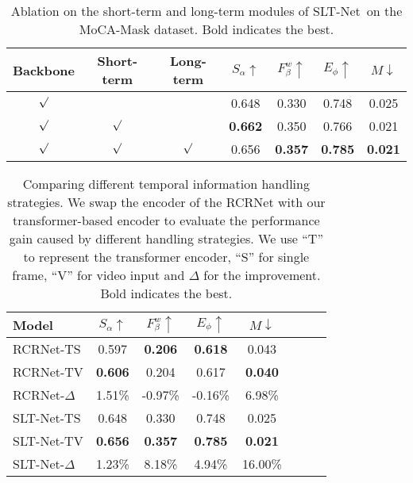\documentclass[10pt,twocolumn,letterpaper]{article}
\def\Ourmodel{SLT-Net}
\begin{document}
\begin{table}[t!]
    \footnotesize
    \centering
    \caption{Ablation on the short-term and long-term modules of \Ourmodel~on the MoCA-Mask dataset. Bold indicates the best.}
    \label{tab:ab_short_long}
    \vspace{-5pt}
    \tabcolsep=0.14cm
    \renewcommand{\arraystretch}{0.5}
    \begin{tabular}{ccc|cccc}
    \toprule
     Backbone & Short-term & Long-term & $S_\alpha\uparrow$ &$F_\beta^w\uparrow$  &$E_\phi\uparrow$ &$M\downarrow$ \\ 
     \midrule 
     $\surd$ & & & {0.648} &  {0.330}  & {0.748}  &  {0.025}  \\
     $\surd$ & $\surd$ & &  \textbf{0.662} & 0.350  & 0.766  & 0.021  \\
     $\surd$ & $\surd$ & $\surd$ & 0.656 & \textbf{0.357} & \textbf{0.785} & \textbf{0.021} \\
     
    \bottomrule
    \end{tabular}
\end{table}

\begin{table}[t!]
    \footnotesize
    \centering
    \caption{Comparing different temporal information handling strategies. We swap the encoder of the RCRNet \cite{yan2019semi} with our transformer-based encoder to evaluate the performance gain caused by different handling strategies. We use ``T'' to represent the transformer encoder, ``S'' for single frame, ``V'' for video input and $\Delta$ for the improvement. Bold indicates the best.}\label{tab:RCRnet}
    \vspace{-5pt}
    \tabcolsep=0.34cm
    \renewcommand{\arraystretch}{0.5}
    \begin{tabular}{l|ccccccc}
    \toprule
Model & $S_\alpha\uparrow$ &$F_\beta^w\uparrow$  &$E_\phi\uparrow$ &$M\downarrow$ \\ 
     \midrule 
     RCRNet-TS & 0.597 & \textbf{0.206} & \textbf{0.618} & 0.043 \\
     RCRNet-TV & \textbf{0.606} & 0.204 & 0.617 & \textbf{0.040} \\
     \hline
      RCRNet-$\Delta$  & 1.51\% &-0.97\% &-0.16\% &6.98\% \\
     \midrule
     \Ourmodel-TS & {0.648} &  {0.330}  & {0.748}  &  {0.025}  \\
     \Ourmodel-TV & \textbf{0.656}& \textbf{0.357} & \textbf{0.785} & \textbf{0.021} \\
     \hline
     \Ourmodel-$\Delta$ & 1.23\% & 8.18\% & 4.94\% & 16.00\% \\
    \bottomrule
    \end{tabular}
    \vspace{-5pt}
\end{table}
\end{document}
